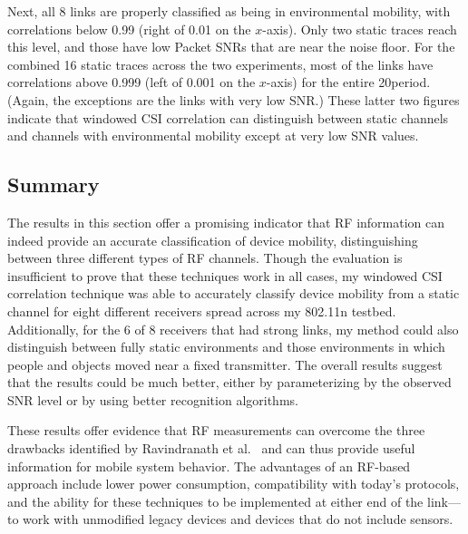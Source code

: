 Next, all 8 links are properly classified as being in environmental mobility, with correlations below 0.99 (right of 0.01 on the $x$-axis). Only two static traces reach this level, and those have low Packet SNRs that are near the noise floor. For the combined 16 static traces across the two experiments, most of the links have correlations above 0.999 (left of 0.001 on the $x$-axis) for the entire 20\s period. (Again, the exceptions are the links with very low SNR.) These latter two figures indicate that windowed CSI correlation can distinguish between static channels and channels with environmental mobility except at very low SNR values.

\subsection{Summary}
The results in this section offer a promising indicator that RF information can indeed provide an accurate classification of device mobility, distinguishing between three different types of RF channels. Though the evaluation is insufficient to prove that these techniques work in all cases, my windowed CSI correlation technique was able to accurately classify device mobility from a static channel for eight different receivers spread across my 802.11n testbed. Additionally, for the 6 of 8 receivers that had strong links, my method could also distinguish between fully static environments and those environments in which people and objects moved near a fixed transmitter. The overall results suggest that the results could be much better, either by parameterizing by the observed SNR level or by using better recognition algorithms.

These results offer evidence that RF measurements can overcome the three drawbacks identified by Ravindranath et al.~\cite{Ravindranath_SensorHints} and can thus provide useful information for mobile system behavior. The advantages of an RF-based approach include lower power consumption, compatibility with today's protocols, and the ability for these techniques to be implemented at either end of the link---to work with unmodified legacy devices and devices that do not include sensors.



